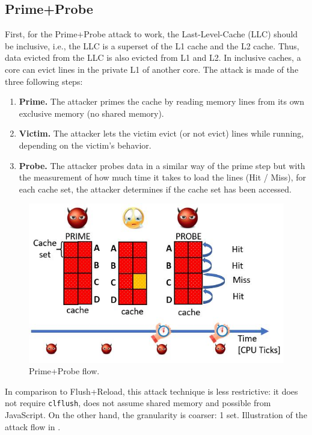 \subsection{Prime+Probe}
\label{subsec:primeprobe}
First, for the Prime+Probe attack to work, the Last-Level-Cache (LLC) should be
inclusive, i.e., the LLC is a superset of the L1 cache and the L2 cache. Thus,
data evicted from the LLC is also evicted from L1 and L2. In inclusive caches, a
core can evict lines in the private L1 of another core. The attack is made of
the three following steps:
\begin{enumerate}
    \item \textbf{Prime.} The attacker primes the cache by reading memory lines
    from its own exclusive memory (no shared memory).
    \item \textbf{Victim.} The attacker lets the victim evict (or not evict)
    lines while running, depending on the victim's behavior.
    \item \textbf{Probe.} The attacker probes data in a similar way of the prime
    step but with the measurement of how much time it takes to load the lines (Hit /
    Miss), for each cache set, the attacker determines if the cache set has been
    accessed.
\end{enumerate}

\begin{figure}[!ht]
    \centering
    \includegraphics[width=\textwidth]{images/chapter_6/pp_flow.JPG}
    \caption{Prime+Probe flow.}
    \label{fig:pp_flow}
\end{figure}

\noindent In comparison to Flush+Reload, this attack technique is less restrictive:
it does not require \texttt{clflush}, does not assume shared memory and possible
from JavaScript. On the other hand, the granularity is coarser: 1 set.
Illustration of the attack flow in .


